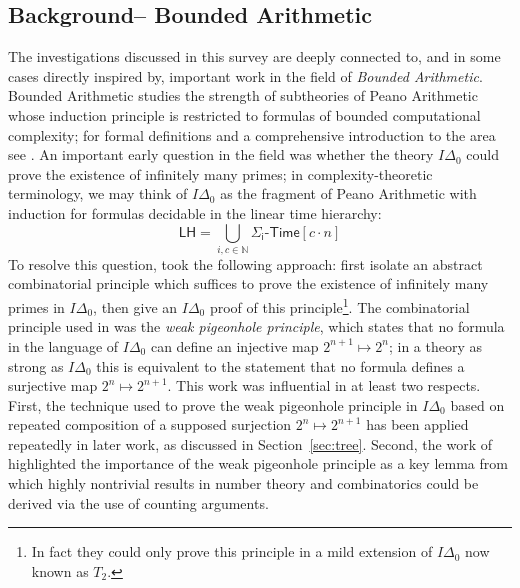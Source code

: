 \documentclass[11pt]{article}
\newcommand{\dash}{\text{-}}
\begin{document}
\subsection{Background-- Bounded Arithmetic}
The investigations discussed in this survey are deeply connected to, and in some cases directly inspired by, important work in the field of \emph{Bounded Arithmetic}. Bounded Arithmetic studies the strength of subtheories of Peano Arithmetic whose induction principle is restricted to formulas of bounded computational complexity; for formal definitions and a comprehensive introduction to the area see \cite{Krajicek}.
An important early question in the field was whether the theory $I\Delta_0$ could prove the existence of infinitely many primes; in complexity-theoretic terminology, we may think of $I\Delta_0$ as the fragment of Peano Arithmetic with induction for formulas decidable in the linear time hierarchy:
\[
\mathsf{LH} = \bigcup_{i,c \in \mathbb{N}} \mathsf{\Sigma_i}\dash\mathsf{Time}[c \cdot n]
\]
To resolve this question, \cite{Paris-Wilkie-Woods} took the following approach: first isolate an abstract combinatorial principle which suffices to prove the existence of infinitely many primes in $I\Delta_0$, then give an $I\Delta_0$ proof of this principle\footnote{In fact they could only prove this principle in a mild extension of $I\Delta_0$ now known as $T_2$.}. The combinatorial principle used in \cite{Paris-Wilkie-Woods} was the \emph{weak pigeonhole principle}, which states that no formula in the language of $I\Delta_0$ can define an injective map $2^{n+1} \mapsto 2^{n}$; in a theory as strong as $I\Delta_0$ this is equivalent to the statement that no formula defines a surjective map $2^n \mapsto 2^{n+1}$. This work was influential in at least two respects. First, the technique used to prove the weak pigeonhole principle in $I\Delta_0$ based on repeated composition of a supposed surjection $2^n \mapsto 2^{n+1}$ has been applied repeatedly in later work, as discussed in Section~\ref{sec:tree}. Second, the work of \cite{Paris-Wilkie-Woods} highlighted the importance of the weak pigeonhole principle as a key lemma from which highly nontrivial results in number theory and combinatorics could be derived via the use of counting arguments.
\end{document}
